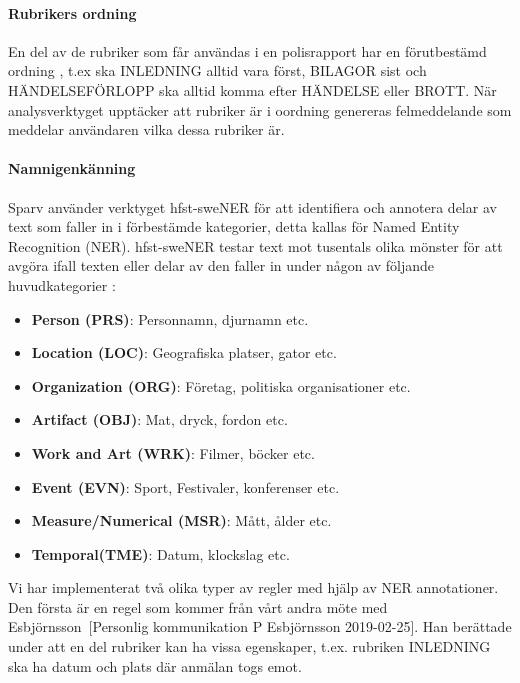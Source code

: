 \documentclass[swedish]{maucsthesis}
\begin{document}
\paragraph*{Rubrikers ordning}

En del av de rubriker som får användas i en polisrapport har en förutbestämd
ordning \cite{durtva:2017}, t.ex ska INLEDNING alltid vara först, BILAGOR sist
och HÄNDELSEFÖRLOPP ska alltid komma efter HÄNDELSE eller BROTT. När
analysverktyget upptäcker att rubriker är i oordning genereras felmeddelande som
meddelar användaren vilka dessa rubriker är.

\paragraph*{Namnigenkänning}\label{namnigenkänning}

Sparv använder verktyget hfst-sweNER \cite{borin:2016} för att identifiera
och annotera delar av text som faller in i förbestämde kategorier, detta kallas för Named Entity Recognition (NER). 
hfst-sweNER testar text mot tusentals olika mönster för att avgöra ifall texten 
eller delar av den faller in under någon av följande huvudkategorier \cite{kokkinakis:2014}:

\begin{itemize}
\item \textbf{Person (PRS)}: Personnamn, djurnamn etc.
\item \textbf{Location (LOC)}: Geografiska platser, gator  etc.
\item \textbf{Organization (ORG)}: Företag, politiska organisationer etc.
\item \textbf{Artifact (OBJ)}: Mat, dryck, fordon etc.
\item \textbf{Work and Art (WRK)}: Filmer, böcker etc.
\item \textbf{Event (EVN)}: Sport, Festivaler, konferenser etc.
\item \textbf{Measure/Numerical (MSR)}:  Mått, ålder etc.
\item \textbf{Temporal(TME)}: Datum, klockslag etc.
\end{itemize}

Vi har implementerat två olika typer av regler med hjälp av NER annotationer.
Den första är en regel som kommer från vårt andra möte med Esbjörnsson~[Personlig kommunikation P Esbjörnsson 2019-02-25].
Han berättade under att en del rubriker kan ha vissa egenskaper, t.ex. rubriken INLEDNING ska ha datum och plats där
anmälan togs emot. 
\end{document}
